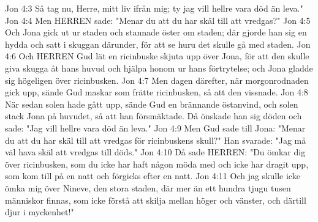 Jon 4:3  Så tag nu, Herre, mitt liv ifrån mig; ty jag vill hellre vara död än leva."
Jon 4:4  Men HERREN sade: "Menar du att du har skäl till att vredgas?"
Jon 4:5  Och Jona gick ut ur staden och stannade öster om staden; där gjorde han sig en hydda och satt i skuggan därunder, för att se huru det skulle gå med staden.
Jon 4:6  Och HERREN Gud lät en ricinbuske skjuta upp över Jona, för att den skulle giva skugga åt hans huvud och hjälpa honom ur hans förtrytelse; och Jona gladde sig högeligen över ricinbusken.
Jon 4:7  Men dagen därefter, när morgonrodnaden gick upp, sände Gud maskar som frätte ricinbusken, så att den vissnade.
Jon 4:8  När sedan solen hade gått upp, sände Gud en brännande östanvind, och solen stack Jona på huvudet, så att han försmäktade. Då önskade han sig döden och sade: "Jag vill hellre vara död än leva."
Jon 4:9  Men Gud sade till Jona: "Menar du att du har skäl till att vredgas för ricinbuskens skull?" Han svarade: "Jag må väl hava skäl att vredgas till döds."
Jon 4:10  Då sade HERREN: "Du ömkar dig över ricinbusken, som du icke har haft någon möda med och icke har dragit upp, som kom till på en natt och förgicks efter en natt.
Jon 4:11  Och jag skulle icke ömka mig över Nineve, den stora staden, där mer än ett hundra tjugu tusen människor finnas, som icke förstå att skilja mellan höger och vänster, och därtill djur i myckenhet!"


